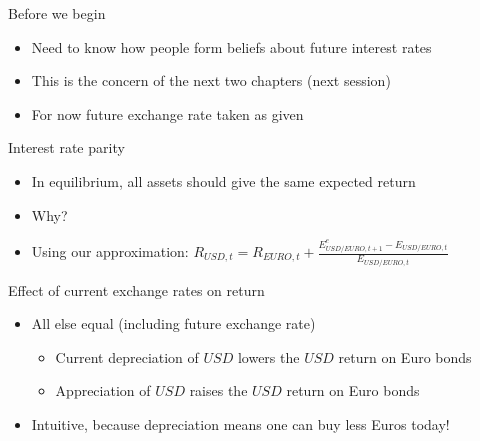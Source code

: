 \documentclass[10pt,hyperref={CJKbookmarks=true},xcolor=dvipsnames,aspectratio=169]{beamer}
\begin{document}
\begin{frame}{Before we begin}

\begin{itemize}
\item Need to know how people form beliefs about future interest rates
\item This is the concern of the next two chapters (next session)
\item For now future exchange rate taken as given
\end{itemize}

\end{frame}

\begin{frame}{Interest rate parity}

\begin{itemize}
\item In equilibrium, all assets should give the same expected return
\item Why?
\item Using our approximation:
$R_{USD,t} = R_{EURO,t} + \frac{E^{e}_{USD/EURO, t+1} - E_{USD/EURO,t}}{E_{USD/EURO,t}}$
\end{itemize}

\end{frame}


\begin{frame}{Effect of current exchange rates on return}

\begin{itemize}
\item All else equal (including future exchange rate)
\begin{itemize}
\item Current depreciation of $USD$ lowers the $USD$ return on Euro bonds
\item Appreciation of $USD$ raises the $USD$ return on Euro bonds
\end{itemize}
\item Intuitive, because depreciation means one can buy less Euros today!
\end{itemize}

\end{frame}
\end{document}

